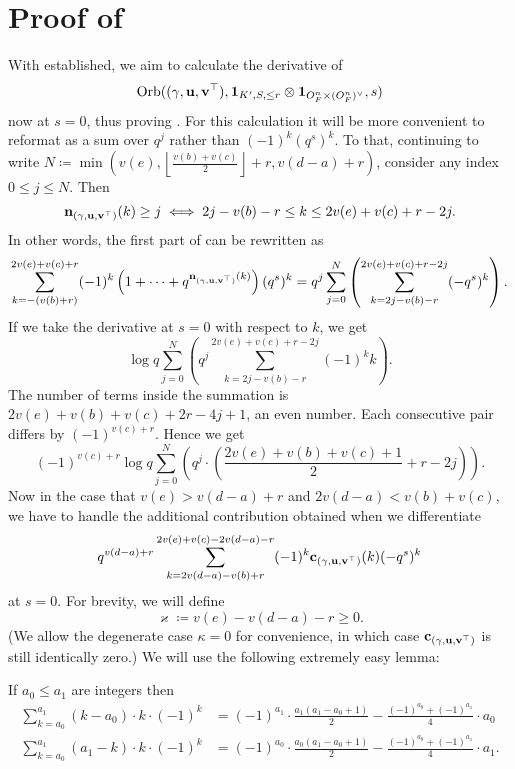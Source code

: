 \section{Proof of }
With  established, we aim to calculate the derivative of
\[ \operatorname{Orb}({(\gamma, \mathbf u, \mathbf v^\top)}, \mathbf{1}_{K', S, \le r} \otimes \mathbf{1}_{O_F^n \times (O_F^n)^\vee}, s) \]
now at $s = 0$, thus proving .
For this calculation it will be more convenient to reformat 
as a sum over $q^j$ rather than $(-1)^k (q^s)^k$.
To that, continuing to write
$N \coloneqq \min \left(
      v(e), \left\lfloor \tfrac{v(b)+v(c)}{2} \right\rfloor + r,
      v(d-a) + r \right)$,
consider any index $0 \le j \le N$.
Then
\[ \mathbf n_{(\gamma, \mathbf u, \mathbf v^\top)}(k) \ge j \iff 2j - v(b) - r \le k \le 2v(e)+v(c)+r-2j. \]
In other words, the first part of  can be rewritten as
\[ \sum_{k = -(v(b)+r)}^{2v(e)+v(c)+r} (-1)^k
  \left( 1 + \dots + q^{\mathbf n_{(\gamma, \mathbf u, \mathbf v^\top)}(k)} \right) (q^s)^k
  = q^j \sum_{j=0}^N \left( \sum_{k=2j-v(b)-r}^{2v(e)+v(c)+r-2j} (-q^s)^k \right). \]
If we take the derivative at $s = 0$ with respect to $k$, we get
\[ \log q \sum_{j=0}^N \left( q^j \sum_{k=2j-v(b)-r}^{2v(e)+v(c)+r-2j} (-1)^k k \right). \]
The number of terms inside the summation is
$2v(e)+v(b)+v(c)+2r-4j+1$, an even number.
Each consecutive pair differs by $(-1)^{v(c)+r}$.
Hence we get
\[ (-1)^{v(c)+r} \log q \sum_{j=0}^N \left( q^j
  \cdot \left( \frac{2v(e)+v(b)+v(c)+1}{2} + r - 2j \right) \right). \]
Now in the case that $v(e) > v(d-a) + r$ and $2v(d-a) < v(b) + v(c)$,
we have to handle the additional contribution obtained when we differentiate
\begin{equation}
  q^{v(d-a)+r}
  \sum_{k = 2v(d-a)-v(b)+r}^{2v(e)+v(c)-2v(d-a)-r} (-1)^k \mathbf c_{(\gamma, \mathbf u, \mathbf v^\top)}(k) (-q^s)^k
  \label{eq:top_derivative}
\end{equation}
at $s = 0$.
For brevity, we will define
\[ \varkappa \coloneqq v(e) - v(d-a) - r \ge 0. \]
(We allow the degenerate case $\kappa = 0$ for convenience,
in which case $\mathbf c_{(\gamma, \mathbf u, \mathbf v^\top)}$ is still identically zero.)
We will use the following extremely easy lemma:
\begin{lemma}
  If $a_0 \le a_1$ are integers then
  \begin{align*}
    \sum_{k=a_0}^{a_1} (k-a_0) \cdot k \cdot (-1)^k
    &= (-1)^{a_1} \cdot \frac{a_1(a_1-a_0+1)}{2} - \frac{(-1)^{a_0} + (-1)^{a_1}}{4} \cdot a_0 \\
    \sum_{k=a_0}^{a_1} (a_1-k) \cdot k \cdot (-1)^k
    &= (-1)^{a_0} \cdot \frac{a_0(a_1-a_0+1)}{2} - \frac{(-1)^{a_0} + (-1)^{a_1}}{4} \cdot a_1.
  \end{align*}
\end{lemma}
